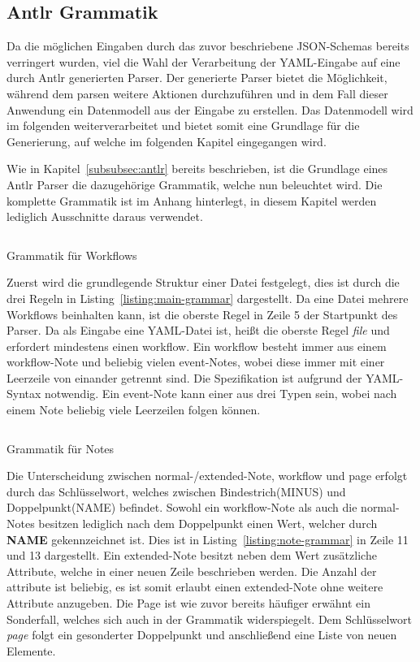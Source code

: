 \subsection{Antlr Grammatik}\label{subsec:antlr-grammatik}
Da die möglichen Eingaben durch das zuvor beschriebene JSON-Schemas bereits verringert wurden, viel die Wahl der Verarbeitung der YAML-Eingabe auf eine durch Antlr generierten Parser.
Der generierte Parser bietet die Möglichkeit, während dem parsen weitere Aktionen durchzuführen und in dem Fall dieser Anwendung ein Datenmodell aus der Eingabe zu erstellen.
Das Datenmodell wird im folgenden weiterverarbeitet und bietet somit eine Grundlage für die Generierung, auf welche im folgenden Kapitel eingegangen wird.

Wie in Kapitel~\ref{subsubsec:antlr} bereits beschrieben, ist die Grundlage eines Antlr Parser die dazugehörige Grammatik, welche nun beleuchtet wird.
Die komplette Grammatik ist im Anhang hinterlegt, in diesem Kapitel werden lediglich Ausschnitte daraus verwendet.

\begin{listing}[!ht]
    \inputminted[xleftmargin=20pt,linenos,firstnumber=5]{antlr}{listings/3.1.3/Main.g4}
    \caption{Grammatik für Workflows}
    \label{listing:main-grammar}
\end{listing}

Zuerst wird die grundlegende Struktur einer Datei festgelegt, dies ist durch die drei Regeln in Listing~\ref{listing:main-grammar} dargestellt.
Da eine Datei mehrere Workflows beinhalten kann, ist die oberste Regel in Zeile 5 der Startpunkt des Parser.
Da als Eingabe eine YAML-Datei ist, heißt die oberste Regel \textit{file} und erfordert mindestens einen workflow.
Ein workflow besteht immer aus einem workflow-Note und beliebig vielen event-Notes, wobei diese immer mit einer Leerzeile von einander getrennt sind.
Die Spezifikation ist aufgrund der YAML-Syntax notwendig.
Ein event-Note kann einer aus drei Typen sein, wobei nach einem Note beliebig viele Leerzeilen folgen können.

\begin{listing}[!ht]
    \inputminted[xleftmargin=20pt,linenos,firstnumber=11]{antlr}{listings/3.1.3/Note.g4}
    \caption{Grammatik für Notes}
    \label{listing:note-grammar}
\end{listing}

Die Unterscheidung zwischen normal-/extended-Note, workflow und page erfolgt durch das Schlüsselwort, welches zwischen Bindestrich(MINUS) und Doppelpunkt(NAME) befindet.
Sowohl ein workflow-Note als auch die normal-Notes besitzen lediglich nach dem Doppelpunkt einen Wert, welcher durch \textbf{NAME} gekennzeichnet ist.
Dies ist in Listing~\ref{listing:note-grammar} in Zeile 11 und 13 dargestellt.
Ein extended-Note besitzt neben dem Wert zusätzliche Attribute, welche in einer neuen Zeile beschrieben werden.
Die Anzahl der attribute ist beliebig, es ist somit erlaubt einen extended-Note ohne weitere Attribute anzugeben.
Die Page ist wie zuvor bereits häufiger erwähnt ein Sonderfall, welches sich auch in der Grammatik widerspiegelt.
Dem Schlüsselwort \textit{page} folgt ein gesonderter Doppelpunkt und anschließend eine Liste von neuen Elemente.

